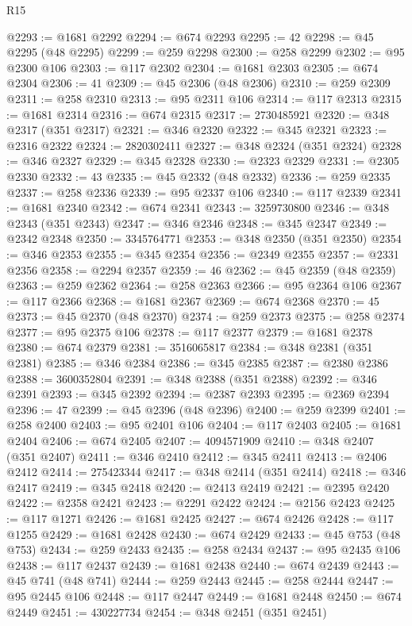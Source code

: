 \begin{lexlean}{R15}
\begin{coremodule}
@2293 := @1681 @2292
@2294 := @674 @2293
@2295 := 42
@2298 := @45 @2295 (@48 @2295)
@2299 := @259 @2298
@2300 := @258 @2299
@2302 := @95 @2300 @106
@2303 := @117 @2302
@2304 := @1681 @2303
@2305 := @674 @2304
@2306 := 41
@2309 := @45 @2306 (@48 @2306)
@2310 := @259 @2309
@2311 := @258 @2310
@2313 := @95 @2311 @106
@2314 := @117 @2313
@2315 := @1681 @2314
@2316 := @674 @2315
@2317 := 2730485921
@2320 := @348 @2317 (@351 @2317)
@2321 := @346 @2320
@2322 := @345 @2321
@2323 := @2316 @2322
@2324 := 2820302411
@2327 := @348 @2324 (@351 @2324)
@2328 := @346 @2327
@2329 := @345 @2328
@2330 := @2323 @2329
@2331 := @2305 @2330
@2332 := 43
@2335 := @45 @2332 (@48 @2332)
@2336 := @259 @2335
@2337 := @258 @2336
@2339 := @95 @2337 @106
@2340 := @117 @2339
@2341 := @1681 @2340
@2342 := @674 @2341
@2343 := 3259730800
@2346 := @348 @2343 (@351 @2343)
@2347 := @346 @2346
@2348 := @345 @2347
@2349 := @2342 @2348
@2350 := 3345764771
@2353 := @348 @2350 (@351 @2350)
@2354 := @346 @2353
@2355 := @345 @2354
@2356 := @2349 @2355
@2357 := @2331 @2356
@2358 := @2294 @2357
@2359 := 46
@2362 := @45 @2359 (@48 @2359)
@2363 := @259 @2362
@2364 := @258 @2363
@2366 := @95 @2364 @106
@2367 := @117 @2366
@2368 := @1681 @2367
@2369 := @674 @2368
@2370 := 45
@2373 := @45 @2370 (@48 @2370)
@2374 := @259 @2373
@2375 := @258 @2374
@2377 := @95 @2375 @106
@2378 := @117 @2377
@2379 := @1681 @2378
@2380 := @674 @2379
@2381 := 3516065817
@2384 := @348 @2381 (@351 @2381)
@2385 := @346 @2384
@2386 := @345 @2385
@2387 := @2380 @2386
@2388 := 3600352804
@2391 := @348 @2388 (@351 @2388)
@2392 := @346 @2391
@2393 := @345 @2392
@2394 := @2387 @2393
@2395 := @2369 @2394
@2396 := 47
@2399 := @45 @2396 (@48 @2396)
@2400 := @259 @2399
@2401 := @258 @2400
@2403 := @95 @2401 @106
@2404 := @117 @2403
@2405 := @1681 @2404
@2406 := @674 @2405
@2407 := 4094571909
@2410 := @348 @2407 (@351 @2407)
@2411 := @346 @2410
@2412 := @345 @2411
@2413 := @2406 @2412
@2414 := 275423344
@2417 := @348 @2414 (@351 @2414)
@2418 := @346 @2417
@2419 := @345 @2418
@2420 := @2413 @2419
@2421 := @2395 @2420
@2422 := @2358 @2421
@2423 := @2291 @2422
@2424 := @2156 @2423
@2425 := @117 @1271
@2426 := @1681 @2425
@2427 := @674 @2426
@2428 := @117 @1255
@2429 := @1681 @2428
@2430 := @674 @2429
@2433 := @45 @753 (@48 @753)
@2434 := @259 @2433
@2435 := @258 @2434
@2437 := @95 @2435 @106
@2438 := @117 @2437
@2439 := @1681 @2438
@2440 := @674 @2439
@2443 := @45 @741 (@48 @741)
@2444 := @259 @2443
@2445 := @258 @2444
@2447 := @95 @2445 @106
@2448 := @117 @2447
@2449 := @1681 @2448
@2450 := @674 @2449
@2451 := 430227734
@2454 := @348 @2451 (@351 @2451)

\end{coremodule}
\end{lexlean}

